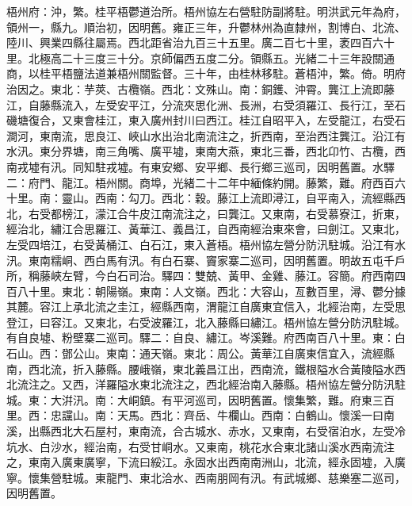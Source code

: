 \begin{pinyinscope}
梧州府：沖，繁。桂平梧鬱道治所。梧州協左右營駐防副將駐。明洪武元年為府，領州一，縣九。順治初，因明舊。雍正三年，升鬱林州為直隸州，割博白、北流、陸川、興業四縣往屬焉。西北距省治九百三十五里。廣二百七十里，袤四百六十里。北極高二十三度三十分。京師偏西五度二分。領縣五。光緒二十三年設關通商，以桂平梧鹽法道兼梧州關監督。三十年，由桂林移駐。蒼梧沖，繁。倚。明府治因之。東北：芋莢、古欖嶺。西北：文殊山。南：銅鑊、沖霄。龔江上流即藤江，自藤縣流入，左受安平江，分流夾思化洲、長洲，右受須羅江、長行江，至石磯塘復合，又東會桂江，東入廣州封川曰西江。桂江自昭平入，左受龍江，右受石澗河，東南流，思良江、峽山水出治北南流注之，折西南，至治西注龔江。沿江有水汛。東分界塘，南三角嘴、廣平墟，東南大燕，東北三番，西北卬竹、古欖，西南戎墟有汛。同知駐戎墟。有東安鄉、安平鄉、長行鄉三巡司，因明舊置。水驛二：府門、龍江。梧州關。商埠，光緒二十二年中緬條約開。藤繁，難。府西百六十里。南：靈山。西南：勾刀。西北：穀。藤江上流即潯江，自平南入，流經縣西北，右受都榜江，濛江合牛皮江南流注之，曰龔江。又東南，右受慕寮江，折東，經治北，繡江合思羅江、黃華江、義昌江，自西南經治東來會，曰劍江。又東北，左受四培江，右受黃桶江、白石江，東入蒼梧。梧州協左營分防汛駐城。沿江有水汛。東南糯峒、西白馬有汛。有白石寨、竇家寨二巡司，因明舊置。明故五屯千戶所，稱藤峽左臂，今白石司治。驛四：雙兢、黃甲、金雞、藤江。容簡。府西南四百八十里。東北：朝陽嶺。東南：人文嶺。西北：大容山，亙數百里，潯、鬱分據其麓。容江上承北流之圭江，經縣西南，渭龍江自廣東宜信入，北經治南，左受思登江，曰容江。又東北，右受波羅江，北入藤縣曰繡江。梧州協左營分防汛駐城。有自良墟、粉壁寨二巡司。驛二：自良、繡江。岑溪難。府西南百八十里。東：白石山。西：鄧公山。東南：通天嶺。東北：周公。黃華江自廣東信宜入，流經縣南，西北流，折入藤縣。腰峨嶺，東北義昌江出，西南流，鐵根隘水合黃陵隘水西北流注之。又西，洋羅隘水東北流注之，西北經治南入藤縣。梧州協左營分防汛駐城。東：大洴汛。南：大峒鎮。有平河巡司，因明舊置。懷集繁，難。府東三百里。西：忠讜山。南：天馬。西北：齊岳、牛欄山。西南：白鶴山。懷溪一曰南溪，出縣西北大石屋村，東南流，合古城水、赤水，又東南，右受宿泊水，左受冷坑水、白沙水，經治南，右受甘峒水。又東南，桃花水合東北諸山溪水西南流注之，東南入廣東廣寧，下流曰綏江。永固水出西南南洲山，北流，經永固墟，入廣寧。懷集營駐城。東龍門、東北洽水、西南朋岡有汛。有武城鄉、慈樂塞二巡司，因明舊置。


\end{pinyinscope}
